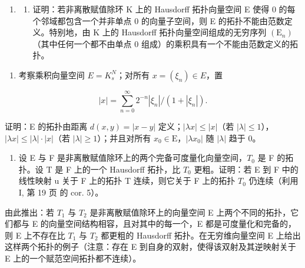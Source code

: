 \begin{enumerate}
\def\labelenumi{\arabic{enumi})}
\tightlist
\item
  \begin{enumerate}
  \def\labelenumii{\alph{enumii})}
  \tightlist
  \item
    证明：若非离散赋值除环 K 上的 Hausdorff 拓扑向量空间 E 使得 0 的每个邻域都包含一个并非单点 0 的向量子空间，则 E 的拓扑不能由范数定义。特别地，由 K 上的 Hausdorff 拓扑向量空间组成的无穷序列 \((\mathrm{E}_{n})\)（其中任何一个都不由单点 0 组成）的乘积具有一个不能由范数定义的拓扑。
  \end{enumerate}
\end{enumerate}

\begin{enumerate}
\def\labelenumi{\alph{enumi})}
\setcounter{enumi}{1}
\tightlist
\item
  考察乘积向量空间 \(E = K_{s}^{N}\)；对所有 \(x = (\xi_{n}) \in E\)，置
\end{enumerate}

\[
| x | = \sum_ {n = 0} ^ {\infty} 2 ^ {- n} \left| \xi_ {n} \right| / (1 + | \xi_ {n} |).
\]

证明：E 的拓扑由距离 \(d(x, y) = |x - y|\) 定义；\(|\lambda x| \leqslant |x|\)（若 \(|\lambda| \leqslant 1\)），\(|\lambda x| \leqslant |\lambda| \cdot |x|\)（若 \(|\lambda| \geqslant 1\)）；并且对所有 \(x_0 \in \mathrm{E}\)，\(|\lambda x_0|\) 随 \(|\lambda|\) 趋于 0。

\begin{enumerate}
\def\labelenumi{\arabic{enumi})}
\setcounter{enumi}{1}
\tightlist
\item
  设 E 与 F 是非离散赋值除环上的两个完备可度量化向量空间，\(T_{0}\) 是 F 的拓扑。设 T 是 F 上的一个 Hausdorff 拓扑，比 \(T_{0}\) 更粗。证明：若 E 到 F 中的线性映射 u 关于 F 上的拓扑 T 连续，则它关于 F 上的拓扑 \(T_{0}\) 仍连续（利用 I, 第 19 页 的 cor. 5）。
\end{enumerate}

由此推出：若 \(T_{1}\) 与 \(T_{2}\) 是非离散赋值除环上的向量空间 E 上两个不同的拓扑，它们都与 E 的向量空间结构相容，且对其中的每一个，E 都是可度量化和完备的，则 E 上不存在比 \(T_{1}\) 与 \(T_{2}\) 都更粗的 Hausdorff 拓扑。在无穷维向量空间 E 上给出这样两个拓扑的例子（注意：存在 E 到自身的双射，使得该双射及其逆映射关于 E 上的一个赋范空间拓扑都不连续）。

